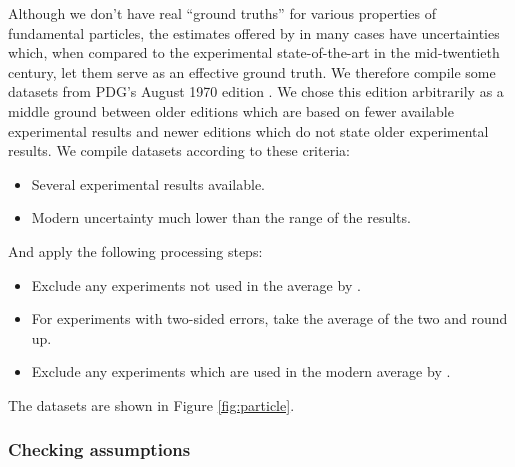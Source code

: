 \documentclass[letterpaper,12pt]{article}
\begin{document}
Although we don't have real ``ground truths'' for various properties of fundamental particles, the estimates offered by \citet{navas2024review} in many cases have uncertainties which, when compared to the experimental state-of-the-art in the mid-twentieth century, let them serve as an effective ground truth. We therefore compile some datasets from PDG's August 1970 edition \citet{roos1970review}. We chose this edition arbitrarily as a middle ground between older editions which are based on fewer available experimental results and newer editions which do not state older experimental results. We compile datasets according to these criteria:
\begin{itemize}
  \item Several experimental results available.
  \item Modern uncertainty much lower than the range of the results.
\end{itemize}
And apply the following processing steps:
\begin{itemize}
  \item Exclude any experiments not used in the average by \citet{roos1970review}.
  \item For experiments with two-sided errors, take the average of the two and round up.
  \item Exclude any experiments which are used in the modern average by \citet{navas2024review}.
\end{itemize}
The datasets are shown in Figure \ref{fig:particle}.

\subsubsection{Checking assumptions}\label{sec:historical-assumptions-check}
\end{document}
